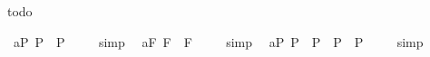 \begin{isabellebody}
\begin{isamarkuptext}
todo%
\end{isamarkuptext}%
\isamarkuptrue%
%
\isamarkuptrue%
\isamarkupfalse%
\ a{}{}{\isacharunderscore}{}{\isacharunderscore}P{\isacharcolon}\ {\isachardoublequoteopen}{\isacharbrackleft}{\isasymA}{\isacharparenleft}\isactrlbold {\isasymnot}{\isacharparenleft}{\isasymphi}\isactrlsup P{\isacharparenright}{\isacharparenright}\ \isactrlbold {\isasymequiv}\ \isactrlbold {\isasymnot}{\isacharparenleft}{\isasymA}{\isacharparenleft}{\isasymphi}\isactrlsup P{\isacharparenright}{\isacharparenright}{\isacharbrackright}\ {\isacharequal}\ {\isasymtop}{\isachardoublequoteclose}%
\isadelimproof
\ %
\endisadelimproof
%
\isatagproof
{}\isamarkupfalse%
\ simp\ \isamarkupfalse%
%
\endisatagproof
{\isafoldproof}%
%
\isadelimproof
%
\endisadelimproof
\isanewline
{}\isamarkupfalse%
\ a{}{}{\isacharunderscore}{}{\isacharunderscore}F{\isacharcolon}\ {\isachardoublequoteopen}{\isacharbrackleft}{\isasymA}{\isacharparenleft}\isactrlbold {\isasymnot}{\isacharparenleft}{\isasymphi}\isactrlsup F{\isacharparenright}{\isacharparenright}\ \isactrlbold {\isasymequiv}\ \isactrlbold {\isasymnot}{\isacharparenleft}{\isasymA}{\isacharparenleft}{\isasymphi}\isactrlsup F{\isacharparenright}{\isacharparenright}{\isacharbrackright}\ {\isacharequal}\ {\isasymtop}{\isachardoublequoteclose}%
\isadelimproof
\ %
\endisadelimproof
%
\isatagproof
{}\isamarkupfalse%
\ simp\ \isamarkupfalse%
%
\endisatagproof
{\isafoldproof}%
%
\isadelimproof
%
\endisadelimproof
\isanewline
{}\isamarkupfalse%
\ a{}{}{\isacharunderscore}{}{\isacharunderscore}P{\isacharcolon}\ {\isachardoublequoteopen}{\isacharbrackleft}{\isasymA}{\isacharparenleft}{\isasymphi}\isactrlsup P\ \isactrlbold {\isasymrightarrow}\ {\isacharparenleft}{\isasympsi}\isactrlsup P{\isacharparenright}{\isacharparenright}\ \isactrlbold {\isasymequiv}\ {\isacharparenleft}{\isasymA}{\isacharparenleft}{\isasymphi}\isactrlsup P{\isacharparenright}\ \isactrlbold {\isasymrightarrow}\ {\isasymA}{\isacharparenleft}{\isasympsi}\isactrlsup P{\isacharparenright}{\isacharparenright}{\isacharbrackright}\ {\isacharequal}\ {\isasymtop}{\isachardoublequoteclose}%
\isadelimproof
\ %
\endisadelimproof
%
\isatagproof
{}\isamarkupfalse%
\ simp\ \isamarkupfalse%
%
\endisatagproof
{\isafoldproof}%
%
\isadelimproof
%
\endisadelimproof
\isanewline

\end{isabellebody}
